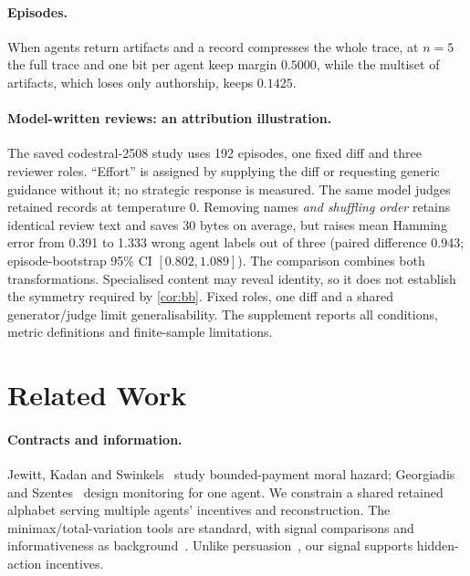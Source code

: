\documentclass[sigconf,anonymous,acmthm=false]{aamas}
\theoremstyle{acmplain}
\theoremstyle{acmdefinition}
\begin{document}
\paragraph{Episodes.} When agents return artifacts and a record compresses the whole trace, at
$n=5$ the full trace and one bit per agent keep margin $0.5000$, while the multiset of artifacts,
which loses only authorship, keeps $0.1425$.

\paragraph{Model-written reviews: an attribution illustration.}
The saved codestral-2508 study uses 192 episodes, one fixed diff and three reviewer roles.
``Effort'' is assigned by supplying the diff or requesting generic guidance without it;
no strategic response is measured. The same model judges retained records at temperature 0.
Removing names \emph{and shuffling order} retains identical review text and saves 30 bytes
on average, but raises mean Hamming error from 0.391 to 1.333 wrong agent labels out of three
(paired difference 0.943; episode-bootstrap 95\% CI $[0.802,1.089]$).
The comparison combines both transformations. Specialised content may reveal identity,
so it does not establish the symmetry required by \cref{cor:bb}. Fixed roles, one diff and
a shared generator/judge limit generalisability. The supplement reports all conditions,
metric definitions and finite-sample limitations.

\section{Related Work}\label{sec:related}

\paragraph{Contracts and information.}
Jewitt, Kadan and Swinkels~\cite{kadanswinkels2008} study bounded-payment moral hazard;
Georgiadis and Szentes~\cite{georgiadisszentes2020} design monitoring for one agent.
We constrain a shared retained alphabet serving multiple agents' incentives and reconstruction.
The minimax/total-variation tools are standard, with signal comparisons and informativeness
as background~\cite{blackwell1953comparisons,holmstrom1979moral}.
Unlike persuasion~\cite{kamenica2011persuasion}, our signal supports hidden-action incentives.
\end{document}
